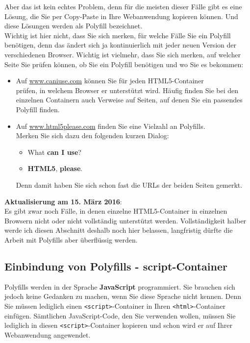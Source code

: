 Aber das ist kein echtes Problem, denn für die meisten dieser Fälle gibt es eine Lösung, die Sie per Copy-Paste in Ihre Webanwendung kopieren können. Und diese Lösungen werden als Polyfill bezeichnet.\\

Wichtig ist hier nicht, dass Sie sich merken, für welche Fälle Sie ein Polyfill benötigen, denn das ändert sich ja kontinuierlich mit jeder neuen Version der verschiedenen Browser. Wichtig ist vielmehr, dass Sie sich merken, auf welcher Seite Sie prüfen können, ob Sie ein Polyfill benötigen und wo Sie es bekommen:

\begin{itemize}
	\item Auf \url{www.caniuse.com} können Sie für jeden HTML5-Container\\prüfen, in welchem Browser er unterstützt wird. Häufig finden Sie bei den einzelnen Containern auch Verweise auf Seiten, auf denen Sie ein passendes Polyfill finden.
	\item Auf \url{www.html5please.com} finden Sie eine Vielzahl an Polyfills.\\
	Merken Sie sich dazu den folgenden kurzen Dialog: 
	\begin{itemize}
		\item What \textbf{can I use}?
		\item \textbf{HTML5}, \textbf{please}.
	\end{itemize}
	Denn damit haben Sie sich schon fast die URLs der beiden Seiten gemerkt.
\end{itemize}

\textbf{Aktualisierung am 15. März 2016}:\\

Es gibt zwar noch Fälle, in denen einzelne HTML5-Container in einzelnen Browsern nicht oder nicht vollständig unterstützt werden.  Vollständigkeit halber werde ich diesen Abschnitt deshalb noch hier belassen, langfristig dürfte die Arbeit mit Polyfills aber überflüssig werden.

\subsection{Einbindung von Polyfills - script-Container}

Polyfills werden in der Sprache \textbf{JavaScript} programmiert. Sie brauchen sich jedoch keine Gedanken zu machen, wenn Sie diese Sprache nicht kennen. Denn Sie müssen lediglich einen \verb|<script>|-Container in Ihren \verb|<html>|-Container einfügen. Sämtlichen JavaScript-Code, den Sie verwenden wollen, müssen Sie lediglich in diesen \verb|<script>|-Container kopieren und schon wird er auf Ihrer Webanwendung angewendet.\\

